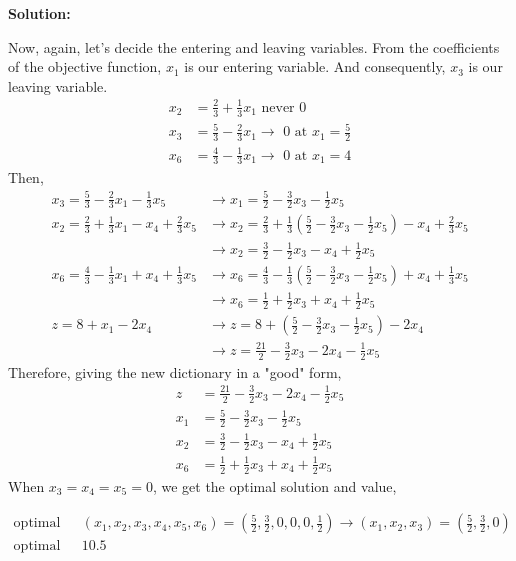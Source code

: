 \documentclass[11pt]{article}
\newenvironment{solution}
  {\par\noindent\textbf{Solution:}\par}
  {\par}
\begin{document}
\begin{solution}
Now, again, let's decide the entering and leaving variables. From the coefficients of the objective function, $x_1$ is our entering variable. And consequently, $x_3$ is our leaving variable.
\[
  \begin{aligned}
    x_2 &= \frac{2}{3} +\frac{1}{3}x_1 \text{ never 0} \\ 
    x_3 &= \frac{5}{3} -\frac{2}{3}x_1 \to \text{ 0 at }x_1=\frac{5}{2}  \\ 
    x_6 &= \frac{4}{3} -\frac{1}{3}x_1 \to \text{ 0 at }x_1=4
  \end{aligned}
\]
Then,
\[
  \begin{aligned}
    x_3 = \frac{5}{3} -\frac{2}{3}x_1 - \frac{1}{3}x_5 &\to x_1 = \frac{5}{2} -\frac{3}{2}x_3 - \frac{1}{2}x_5   \\ 
    x_2 =  \frac{2}{3} +\frac{1}{3} x_1 -x_4 + \frac{2}{3}x_5 &\to x_2 =  \frac{2}{3} +\frac{1}{3} (\frac{5}{2} -\frac{3}{2}x_3 - \frac{1}{2}x_5) -x_4 + \frac{2}{3}x_5 \\ 
                                                              &\to x_2 = \frac{3}{2} -\frac{1}{2}x_3 -x_4 +\frac{1}{2}x_5 \\ 
    x_6 = \frac{4}{3} -\frac{1}{3}x_1 +x_4 + \frac{1}{3}x_5 &\to x_6 = \frac{4}{3} -\frac{1}{3}(\frac{5}{2} -\frac{3}{2}x_3 - \frac{1}{2}x_5) +x_4 + \frac{1}{3}x_5 \\ 
                                                            &\to x_6 =  \frac{1}{2} +\frac{1}{2}x_3 +x_4 +  \frac{1}{2}x_5 \\ 
    z = 8 +x_1 -2x_4 &\to z = 8 + (\frac{5}{2} -\frac{3}{2}x_3 - \frac{1}{2}x_5) -2x_4 \\ 
                     &\to z= \frac{21}{2} -  \frac{3}{2}x_3-2x_4 - \frac{1}{2}x_5
  \end{aligned}
\]
Therefore, giving the new dictionary in a "good" form,
 \[
  \begin{aligned}
    z &=  \frac{21}{2} -  \frac{3}{2}x_3-2x_4 - \frac{1}{2}x_5\\
    x_1 &= \frac{5}{2} -\frac{3}{2}x_3 - \frac{1}{2}x_5  \\ 
    x_2 &= \frac{3}{2} -\frac{1}{2}x_3 -x_4 +\frac{1}{2}x_5 \\
    x_6 &= \frac{1}{2} +\frac{1}{2}x_3 +x_4 +  \frac{1}{2}x_5 
  \end{aligned}
  \]
When $x_3=x_4= x_5=0$, we get the optimal solution and value,

\[
  \begin{aligned}
    \text{optimal solution: } &(x_1,x_2,x_3,x_4,x_5,x_6) = (\frac{5}{2},\frac{3}{2},0,0,0,\frac{1}{2}) \to (x_1,x_2,x_3) = (\frac{5}{2},\frac{3}{2},0) \\ 
    \text{optimal value: } &10.5
  \end{aligned}
\]
\end{solution}
\end{document}
